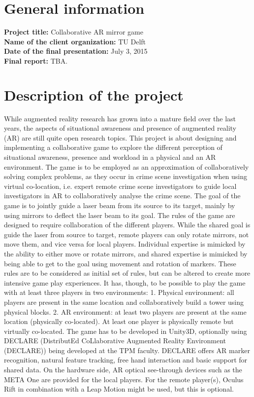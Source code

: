 \documentclass[]{article}
\begin{document}
\section*{General information}
\textbf{Project title:} Collaborative AR mirror game\\
\textbf{Name of the client organization:} TU Delft\\
\textbf{Date of the final presentation:} July 3, 2015\\
\textbf{Final report:} TBA.\\

\section*{Description of the project}
While augmented reality research has grown into a mature field over the last years, the aspects of situational awareness and presence of augmented reality (AR) are still quite open research topics. This project is about designing and implementing a collaborative game to explore the different perception of situational awareness, presence and workload in a physical and an AR environment. The game is to be employed as an approximation of collaboratively solving complex problems, as they occur in crime scene investigation when using virtual co-location, i.e. expert remote crime scene investigators to guide local investigators in AR to collaboratively analyse the crime scene. The goal of the game is to jointly guide a laser beam from its source to its target, mainly by using mirrors to deflect the laser beam to its goal. The rules of the game are designed to require collaboration of the different players. While the shared goal is guide the laser from source to target, remote players can only rotate mirrors, not move them, and vice versa for local players. Individual expertise is mimicked by the ability to either move or rotate mirrors, and shared expertise is mimicked by being able to get to the goal using movement and rotation of markers. These rules are to be considered as initial set of rules, but can be altered to create more intensive game play experiences. It has, though, to be possible to play the game with at least three players in two environments: 1. Physical environment: all players are present in the same location and collaboratively build a tower using physical blocks. 2. AR environment: at least two players are present at the same location (physically co-located). At least one player is physically remote but virtually co-located. The game has to be developed in Unity3D, optionally using DECLARE (DistributEd CoLlaborative Augmented Reality Environment (DECLARE)) being developed at the TPM faculty. DECLARE offers AR marker recognition, natural feature tracking, free hand interaction and basic support for shared data. On the hardware side, AR optical see-through devices such as the META One are provided for the local players. For the remote player(s), Oculus Rift in combination with a Leap Motion might be used, but this is optional. 
\end{document}
